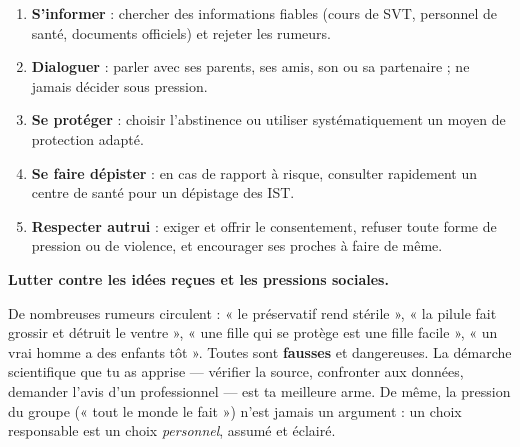 \documentclass[11pt]{article}
\begin{document}
\begin{methode}
\begin{enumerate}
\item \textbf{S'informer} : chercher des informations fiables (cours de SVT, personnel de santé, documents officiels) et rejeter les rumeurs.
\item \textbf{Dialoguer} : parler avec ses parents, ses amis, son ou sa partenaire ; ne jamais décider sous pression.
\item \textbf{Se protéger} : choisir l'abstinence ou utiliser systématiquement un moyen de protection adapté.
\item \textbf{Se faire dépister} : en cas de rapport à risque, consulter rapidement un centre de santé pour un dépistage des IST.
\item \textbf{Respecter autrui} : exiger et offrir le consentement, refuser toute forme de pression ou de violence, et encourager ses proches à faire de même.
\end{enumerate}
\end{methode}

\textbf{Lutter contre les idées reçues et les pressions sociales.}\par

De nombreuses rumeurs circulent : « le préservatif rend stérile », « la pilule fait grossir et détruit le ventre », « une fille qui se protège est une fille facile », « un vrai homme a des enfants tôt ». Toutes sont \textbf{fausses} et dangereuses. La démarche scientifique que tu as apprise — vérifier la source, confronter aux données, demander l'avis d'un professionnel — est ta meilleure arme. De même, la pression du groupe (« tout le monde le fait ») n'est jamais un argument : un choix responsable est un choix \emph{personnel}, assumé et éclairé.
\end{document}
